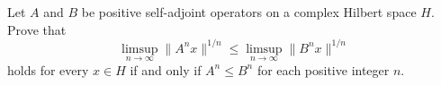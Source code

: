 Let $A$ and $B$ be positive self-adjoint operators on a complex Hilbert space $H$. Prove that
\[\limsup_{n \to \infty} \|A^n x\|^{1/n} \le
\limsup_{n \to \infty} \|B^n x\|^{1/n}\]holds for every $x \in H$ if and only if $A^n \le B^n$ for each positive integer $n$.